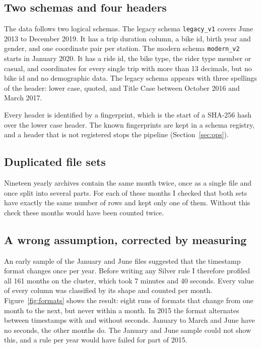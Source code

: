 \documentclass[11pt,a4paper]{article}
\newcommand{\code}[1]{\texttt{\small #1}}
\begin{document}
\subsection{Two schemas and four headers}

The data follows two logical schemas. The legacy schema \code{legacy\_v1} covers June 2013 to December 2019. It has a trip
duration column, a bike id, birth year and gender, and one coordinate pair per station. The modern schema
\code{modern\_v2} starts in January 2020. It has a ride id, the bike type, the rider type member or casual, and coordinates
for every single trip with more than 13 decimals, but no bike id and no demographic data. The legacy schema appears with
three spellings of the header: lower case, quoted, and Title Case between October 2016 and March 2017.

Every header is identified by a fingerprint, which is the start of a SHA-256 hash over the lower case header. The known
fingerprints are kept in a schema registry, and a header that is not registered stops the pipeline
(Section~\ref{sec:ops}).

\subsection{Duplicated file sets}

Nineteen yearly archives contain the same month twice, once as a single file and once split into several parts. For each
of these months I checked that both sets have exactly the same number of rows and kept only one of them. Without this check
these months would have been counted twice.

\subsection{A wrong assumption, corrected by measuring}

An early sample of the January and June files suggested that the timestamp format changes once per year. Before writing
any Silver rule I therefore profiled all 161 months on the cluster, which took 7 minutes and 40 seconds. Every value of
every column was classified by its shape and counted per month. Figure~\ref{fig:formats} shows the result: eight runs of
formats that change from one month to the next, but never within a month. In 2015 the format alternates between timestamps
with and without seconds. January to March and June have no seconds, the other months do. The January and June sample
could not show this, and a rule per year would have failed for part of 2015.
\end{document}
